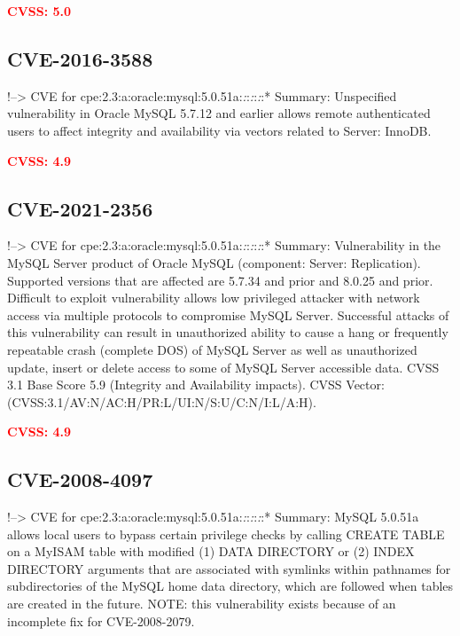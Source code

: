 \documentclass[a4paper, 12pt]{article}
\begin{document}
\textbf{\textcolor{red}{CVSS: 5.0}}

\hypertarget{cve-2016-3588}{%
\subsection{CVE-2016-3588}\label{cve-2016-3588}}

!--\textgreater{} CVE for
cpe:2.3:a:oracle:mysql:5.0.51a:\emph{:}:\emph{:}:\emph{:}:* Summary:
Unspecified vulnerability in Oracle MySQL 5.7.12 and earlier allows
remote authenticated users to affect integrity and availability via
vectors related to Server: InnoDB.

\textbf{\textcolor{red}{CVSS: 4.9}}

\hypertarget{cve-2021-2356}{%
\subsection{CVE-2021-2356}\label{cve-2021-2356}}

!--\textgreater{} CVE for
cpe:2.3:a:oracle:mysql:5.0.51a:\emph{:}:\emph{:}:\emph{:}:* Summary:
Vulnerability in the MySQL Server product of Oracle MySQL (component:
Server: Replication). Supported versions that are affected are 5.7.34
and prior and 8.0.25 and prior. Difficult to exploit vulnerability
allows low privileged attacker with network access via multiple
protocols to compromise MySQL Server. Successful attacks of this
vulnerability can result in unauthorized ability to cause a hang or
frequently repeatable crash (complete DOS) of MySQL Server as well as
unauthorized update, insert or delete access to some of MySQL Server
accessible data. CVSS 3.1 Base Score 5.9 (Integrity and Availability
impacts). CVSS Vector: (CVSS:3.1/AV:N/AC:H/PR:L/UI:N/S:U/C:N/I:L/A:H).

\textbf{\textcolor{red}{CVSS: 4.9}}

\hypertarget{cve-2008-4097}{%
\subsection{CVE-2008-4097}\label{cve-2008-4097}}

!--\textgreater{} CVE for
cpe:2.3:a:oracle:mysql:5.0.51a:\emph{:}:\emph{:}:\emph{:}:* Summary:
MySQL 5.0.51a allows local users to bypass certain privilege checks by
calling CREATE TABLE on a MyISAM table with modified (1) DATA DIRECTORY
or (2) INDEX DIRECTORY arguments that are associated with symlinks
within pathnames for subdirectories of the MySQL home data directory,
which are followed when tables are created in the future. NOTE: this
vulnerability exists because of an incomplete fix for CVE-2008-2079.
\end{document}
